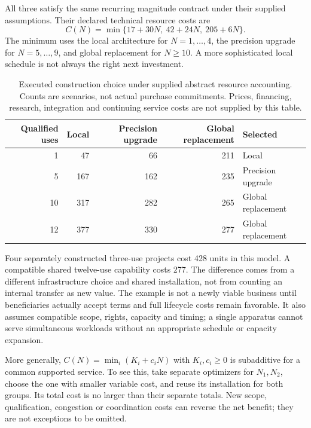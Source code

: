 \documentclass[11pt,letterpaper]{article}
\theoremstyle{definition}\newtheorem{definition}[theorem]{Definition}
\theoremstyle{remark}\newtheorem{remark}[theorem]{Remark}
\begin{document}
All three satisfy the same recurring magnitude contract under their supplied assumptions. Their declared technical resource costs are
\begin{equation}
 C(N)=\min\{17+30N,\ 42+24N,\ 205+6N\}.
 \label{eq:frontier}
\end{equation}
The minimum uses the local architecture for $N=1,\ldots,4$, the precision upgrade for $N=5,\ldots,9$, and global replacement for $N\geq10$. A more sophisticated local schedule is not always the right next investment.

\begin{table}[htbp]
\centering\small
\begin{tabular}{rrrrl}
\toprule
Qualified uses & Local & Precision upgrade & Global replacement & Selected\\
\midrule
1 &47&66&211&Local\\
5 &167&162&235&Precision upgrade\\
10&317&282&265&Global replacement\\
12&377&330&277&Global replacement\\
\bottomrule
\end{tabular}
\caption{Executed construction choice under supplied abstract resource accounting. Counts are scenarios, not actual purchase commitments. Prices, financing, research, integration and continuing service costs are not supplied by this table.}
\label{tab:costs}
\end{table}

Four separately constructed three-use projects cost 428 units in this model. A compatible shared twelve-use capability costs 277. The difference comes from a different infrastructure choice and shared installation, not from counting an internal transfer as new value. The example is not a newly viable business until beneficiaries actually accept terms and full lifecycle costs remain favorable. It also assumes compatible scope, rights, capacity and timing; a single apparatus cannot serve simultaneous workloads without an appropriate schedule or capacity expansion.

More generally, $C(N)=\min_i(K_i+c_iN)$ with $K_i,c_i\geq0$ is subadditive for a common supported service. To see this, take separate optimizers for $N_1,N_2$, choose the one with smaller variable cost, and reuse its installation for both groups. Its total cost is no larger than their separate totals. New scope, qualification, congestion or coordination costs can reverse the net benefit; they are not exceptions to be omitted.
\end{document}
